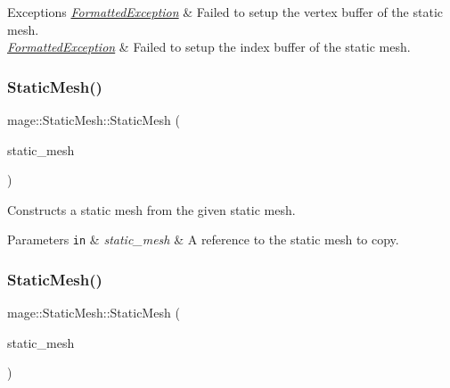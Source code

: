 \begin{DoxyExceptions}{Exceptions}
{\em \hyperlink{classmage_1_1_formatted_exception}{Formatted\+Exception}} & Failed to setup the vertex buffer of the static mesh. \\
\hline
{\em \hyperlink{classmage_1_1_formatted_exception}{Formatted\+Exception}} & Failed to setup the index buffer of the static mesh. \\
\hline
\end{DoxyExceptions}
\hypertarget{classmage_1_1_static_mesh_a15be69ad312c252c9816a57ec1555d73}{}\label{classmage_1_1_static_mesh_a15be69ad312c252c9816a57ec1555d73} 
\subsubsection{\texorpdfstring{Static\+Mesh()}{StaticMesh()}\hspace{0.1cm}{\footnotesize\ttfamily [5/6]}}
{\footnotesize\ttfamily mage\+::\+Static\+Mesh\+::\+Static\+Mesh (\begin{DoxyParamCaption}\item[{const \hyperlink{classmage_1_1_static_mesh}{Static\+Mesh} \&}]{static\+\_\+mesh }\end{DoxyParamCaption})\hspace{0.3cm}{\ttfamily [delete]}}

Constructs a static mesh from the given static mesh.


\begin{DoxyParams}[1]{Parameters}
\mbox{\tt in}  & {\em static\+\_\+mesh} & A reference to the static mesh to copy. \\
\hline
\end{DoxyParams}
\hypertarget{classmage_1_1_static_mesh_a4b3fab6fc753dc32d91bd8260ba3828f}{}\label{classmage_1_1_static_mesh_a4b3fab6fc753dc32d91bd8260ba3828f} 
\subsubsection{\texorpdfstring{Static\+Mesh()}{StaticMesh()}\hspace{0.1cm}{\footnotesize\ttfamily [6/6]}}
{\footnotesize\ttfamily mage\+::\+Static\+Mesh\+::\+Static\+Mesh (\begin{DoxyParamCaption}\item[{\hyperlink{classmage_1_1_static_mesh}{Static\+Mesh} \&\&}]{static\+\_\+mesh }\end{DoxyParamCaption})\hspace{0.3cm}{\ttfamily [default]}}

